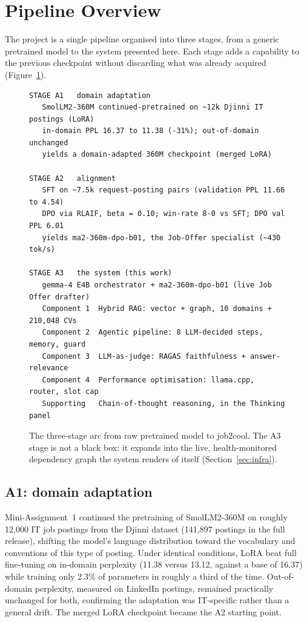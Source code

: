 \section{Pipeline Overview}

The project is a single pipeline organised into three stages, from a generic pretrained
model to the system presented here. Each stage adds a capability to the previous
checkpoint without discarding what was already acquired (Figure~\ref{fig:arc}).

\begin{figure}[h]
\begin{verbatim}
STAGE A1   domain adaptation
   SmolLM2-360M continued-pretrained on ~12k Djinni IT postings (LoRA)
   in-domain PPL 16.37 to 11.38 (-31%); out-of-domain unchanged
   yields a domain-adapted 360M checkpoint (merged LoRA)

STAGE A2   alignment
   SFT on ~7.5k request-posting pairs (validation PPL 11.66 to 4.54)
   DPO via RLAIF, beta = 0.10; win-rate 8-0 vs SFT; DPO val PPL 6.01
   yields ma2-360m-dpo-b01, the Job-Offer specialist (~430 tok/s)

STAGE A3   the system (this work)
   gemma-4 E4B orchestrator + ma2-360m-dpo-b01 (live Job Offer drafter)
   Component 1  Hybrid RAG: vector + graph, 10 domains + 210,048 CVs
   Component 2  Agentic pipeline: 8 LLM-decided steps, memory, guard
   Component 3  LLM-as-judge: RAGAS faithfulness + answer-relevance
   Component 4  Performance optimisation: llama.cpp, router, slot cap
   Supporting   Chain-of-thought reasoning, in the Thinking panel
\end{verbatim}
\caption{The three-stage arc from raw pretrained model to job2cool. The A3 stage is not a
black box: it expands into the live, health-monitored dependency graph the system renders
of itself (Section~\ref{sec:infra}).}
\label{fig:arc}
\end{figure}

\subsection{A1: domain adaptation}

Mini-Assignment~1 continued the pretraining of SmolLM2-360M on roughly 12,000 IT job
postings from the Djinni dataset (141,897 postings in the full release), shifting the
model's language distribution toward the vocabulary and conventions of this type of
posting. Under identical conditions, LoRA beat full fine-tuning on in-domain perplexity
(11.38 versus 13.12, against a base of 16.37) while training only 2.3\% of parameters in
roughly a third of the time. Out-of-domain perplexity, measured on LinkedIn postings,
remained practically unchanged for both, confirming the adaptation was IT-specific rather
than a general drift. The merged LoRA checkpoint became the A2 starting point.


